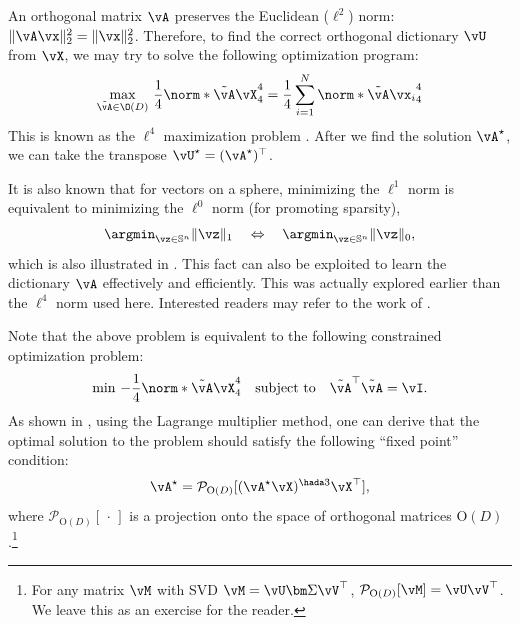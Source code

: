 \documentclass[../../book-main.tex]{subfiles}
\begin{document}
An orthogonal matrix $\vA$ preserves the Euclidean (\(\ell^{2}\))
norm: $\|\vA \vx\|_2^2 = \|\vx\|_2^2$. Therefore, to find the correct
orthogonal dictionary $\vU$ from $\vX$, we may try to solve the
following optimization program:
\begin{equation}\label{eq0:orthogonal-dictionary-learning-l4}
    \max_{\tilde{\vA} \in \O(D)}\,
    \frac{1}{4} \norm*{
        \tilde{\vA} \vX
    }_4^4 =  \frac{1}{4} \sum_{i=1}^N \norm*{
        \tilde{\vA} \vx_i
    }_4^4
\end{equation}
This is known as the $\ell^4$ maximization problem \cite{Zhai-2020}. After we
find the solution \(\vA^{\star}\), we can take the transpose \(\vU^{\star}
= (\vA^{\star})^{\top}\).
\begin{remark}
    It is also known that for vectors on a sphere, minimizing the
    $\ell^1$ norm is equivalent to minimizing the $\ell^0$ norm (for
    promoting sparsity),
    \begin{equation*}
        \argmin_{\vz \in
        \mathbb{S}^n}\|\vz\|_{1}\quad\Leftrightarrow\quad
        \argmin_{\vz \in \mathbb{S}^n}\|\vz\|_{0},
    \end{equation*}
    which is also illustrated in . This fact can
    also be exploited to learn the dictionary $\vA$ effectively and
    efficiently. This was actually explored earlier than the $\ell^4$
    norm used here. Interested readers may refer to the work of
    \cite{qu2020findingsparsestvectorssubspace}.
\end{remark}

Note that the above problem is equivalent to the following
constrained optimization problem:
\begin{equation}\label{eq:orthogonal-dictionary-learning-l4}
    \min\,
    -   \frac{1}{4} \norm*{
        \tilde{\vA} \vX
    }_4^4 \quad \mbox{subject to} \quad  \tilde{\vA}^\top\tilde{\vA} = \vI.
\end{equation}
As shown in \cite{Wright-Ma-2022}, using the Lagrange multiplier
method, one can derive that the optimal solution to the problem
should satisfy the following
``fixed point'' condition:
\begin{equation}
    \vA^{\star} = \mathcal{P}_{\mathrm O(D)}[( {\vA^{\star}
    \vX})^{\hada 3}\vX^\top],
\end{equation}
where $\mathcal{P}_{\mathrm O(D)}[\,\cdot\,]$ is a projection onto the space of
orthogonal matrices $\mathrm O(D)$.\footnote{For any matrix $\vM$
    with SVD $\vM = \vU\bm \Sigma \vV^\top$, $\mathcal{P}_{\mathrm
O(D)}[\vM] = \vU \vV^\top$. We leave this as an exercise for the reader.}
\end{document}
